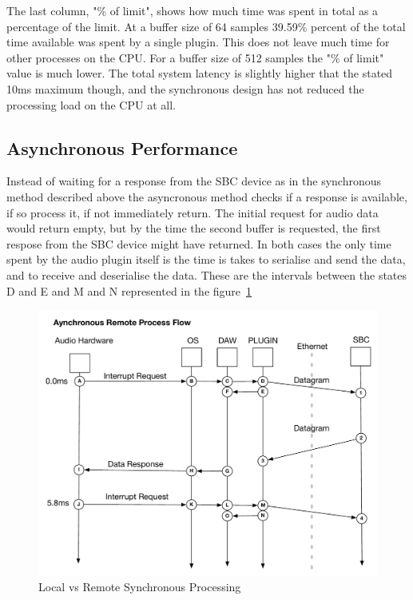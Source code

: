 The last column, "\% of limit", shows how much time was spent in total as a percentage of the limit. At a buffer size of 64 samples 39.59\% percent of the total time available was spent by a single plugin. This does not leave much time for other processes on the CPU. For a buffer size of 512 samples the "\% of limit" value is much lower. The total system latency is slightly higher that the stated 10ms maximum though, and the synchronous design has not reduced the processing load on the CPU at all.


\subsection{Asynchronous Performance}

Instead of waiting for a response from the SBC device as in the synchronous method described above the asyncronous
method checks if a response is available, if so process it, if not immediately return. The initial request for
audio data would return empty, but by the time the second buffer is requested, the first respose from the SBC device
might have returned. In both cases the only time spent by the audio plugin itself is the time is takes to serialise and
send the data, and to receive and deserialise the data. These are the intervals between the states D and E
and M and N represented in the figure~\ref{fig:async_remote}

\begin{figure}[H]
    \centering
    \includegraphics[width=\textwidth]{assets/conclusion/async_flow.pdf}
    \caption{Local vs Remote Synchronous Processing}
    \label{fig:async_remote}
\end{figure}

